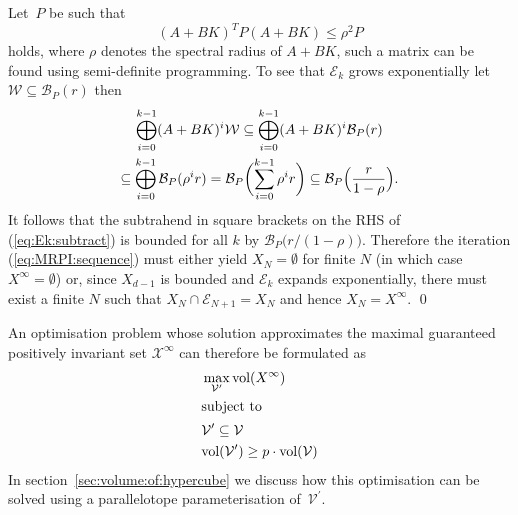 \documentclass{ifacconf}
\def\epf{\hfill \mbox{\qed}}%
\providecommand{\vol}{\text{vol}}
\providecommand{\B}{\mathcal B}
\providecommand{\Xinfty}{{\mathscr X}^\infty}
\providecommand{\E}{\mathcal E}
\providecommand{\W}{\mathcal W}
\providecommand{\V}{\mathcal V}
\begin{document}
Let~$P$ be such that 
\[
(A+BK)^TP(A+BK) \leq \rho^2P
\]
holds, where $\rho$ denotes the spectral radius of $A+BK$, such a matrix can be found using semi-definite programming.
%
To see that $\E_k$ grows exponentially let $\W\subseteq\B_P(r)$ then
%
\begin{multline*}
  \bigoplus_{i=0}^{k-1}(A+BK)^i\W \subseteq \bigoplus_{i=0}^{k-1}(A+BK)^i\B_P(r)\\
  \subseteq\bigoplus_{i=0}^{k-1}\B_P(\rho^i r) = \B_P\biggl(\sum_{i=0}^{k-1}\rho^i r\biggr)\subseteq\B_P\Bigl(\frac{r}{1-\rho}\Bigr) .
\end{multline*}
%
It follows that the subtrahend in square brackets on the RHS of (\ref{eq:Ek:subtract}) is bounded for all $k$ by $\B_P\bigl(r / (1-\rho)\bigr)$.
%
Therefore 
the iteration (\ref{eq:MRPI:sequence}) must either yield $X_N = \emptyset$ for finite $N$
(in which case $X^\infty=\emptyset$) or,
since $X_{d-1}$ is bounded and $\E_k$ expands exponentially, there must exist a finite $N$ such that $X_{N}\cap\E_{N+1}=X_N$ and hence $X_N=X^\infty$.
%
\epf

An optimisation problem whose solution approximates the maximal guaranteed positively invariant set $\Xinfty$ can therefore be formulated as
%
\begin{subequations}\label{seq:optimisation:MRPI:abstract}
\begin{align}
		& \max_{\V^\prime} \vol(X^\infty) \\
%
\intertext{subject to}
%
	& \V^\prime\subseteq\V \\
	& \vol(\V^\prime)\geq p\cdot\vol(\V)
\end{align}
\end{subequations}
%
In section~\ref{sec:volume:of:hypercube} we discuss how this optimisation can be solved using a parallelotope parameterisation of~$\V^\prime$.
\end{document}
